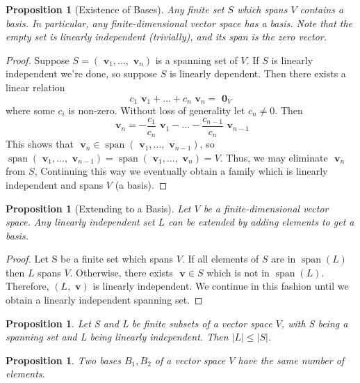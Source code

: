 \documentclass[12pt]{article}
\newtheorem{prop}[thm]{Proposition}
\theoremstyle{definition}
\theoremstyle{remark}
\numberwithin{equation}{section}
\newcommand\B[1]{\textbf{ #1}}
\DeclareMathOperator{\spn}{span}
\begin{document}
\vspace{15pt}

\begin{prop}[Existence of Bases]
        Any finite set $S$ which spans $V$ contains a basis. In particular, any finite-dimensional vector space has a basis. Note that the empty set is linearly independent (trivially), and its span is the zero vector.
\end{prop}
\begin{proof}
        Suppose $S = (\B{v}_1,...,\B{v}_n)$ is a spanning set of $V$. If $S$ is linearly independent we're done, so suppose $S$ is linearly dependent. Then there exists a linear relation $$c_1\B{v}_1+...+c_n\B{v}_n = \B{0}_V$$ where some $c_i$ is non-zero. Without loss of generality let $c_n \neq 0$. Then $$\B{v}_n = -\frac{c_1}{c_n}\B{v}_1-...-\frac{c_{n-1}}{c_n}\B{v}_{n-1}$$ This shows that $\B{v}_n \in \spn(\B{v}_1,...,\B{v}_{n-1})$, so $\spn(\B{v}_1,...,\B{v}_{n-1}) = \spn(\B{v}_1,...,\B{v}_n) = V$. Thus, we may eliminate $\B{v}_n$ from $S$, Continuing this way we eventually obtain a family which is linearly independent and spans $V$ (a basis).
\end{proof}

\vspace{15pt}

\begin{prop}[Extending to a Basis]
        Let $V$ be a finite-dimensional vector space. Any linearly independent set $L$ can be extended by adding elements to get a basis.
\end{prop}
\begin{proof}
        Let S be a finite set which spans $V$. If all elements of $S$ are in $\spn(L)$ then $L$ spans $V$. Otherwise, there exists $\B{v} \in S$ which is not in $\spn(L)$. Therefore, $(L,\B{v})$ is linearly independent. We continue in this fashion until we obtain a linearly independent spanning set.
\end{proof}

\vspace{15pt}

\begin{prop}
        Let S and L be finite subsets of a vector space $V$, with S being a spanning set and L being linearly independent. Then $|L| \leq |S|$.
\end{prop}

\vspace{15pt}

\begin{prop}
        Two bases $B_1,B_2$ of a vector space $V$ have the same number of elements.
\end{prop}
\end{document}
